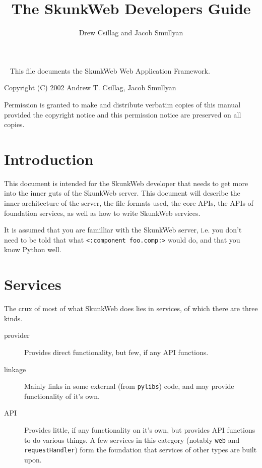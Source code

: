 \documentclass{manual}
\title{The SkunkWeb Developers Guide}
\author{Drew Csillag and Jacob Smullyan}
\begin{document}
\newcommand{\Location}{\texttt{Location}}
\newcommand{\PAR}{\texttt{par}}
\newcommand{\mskunkroot}[1]{\textit{SkunkRoot}\texttt{#1}}
\newcommand{\swpython}{\texttt{swpython}}
\newcommand{\connection}{\texttt{Connection}}
\newcommand{\NOTE}[1]{\textbf{\Large #1}}
\newcommand{\None}{\texttt{None}}
\newcommand{\nolocation}{[N]}
\newcommand{\service}[1]{\texttt{#1}\index{\texttt{#1}}}

\newcommand{\argdescitem}[1]{\hspace\labelsep
                                \normalfont\ttfamily #1\ }
\newenvironment{argdesc}{\begin{list}{}{
        \renewcommand{\makelabel}{\argdescitem}
}
}{\end{list}}

\maketitle
\ 
\vfill 
\noindent
This file documents the SkunkWeb Web Application Framework.

\noindent
Copyright (C) 2002 Andrew T. Csillag, Jacob Smullyan

\noindent
Permission is granted to make and distribute verbatim copies of
this manual provided the copyright notice and this permission notice
are preserved on all copies.


\tableofcontents

\chapter{Introduction}
This document is intended for the SkunkWeb developer that needs to get
more into the inner guts of the SkunkWeb server.  This document will
describe the inner architecture of the server, the file formats used,
the core APIs, the APIs of foundation services,
as well as how to
write SkunkWeb services.

It is assumed that you are familliar with the SkunkWeb server,
i.e. you don't need to be told that what \texttt{<:component
foo.comp:>} would do, and that you know Python well.

\chapter{Services}
The crux of most of what SkunkWeb does lies in services, of which
there are three kinds.
\begin{description}
\item[provider] Provides direct functionality, but few, if any API functions.
\item[linkage] Mainly links in some external (from \texttt{pylibs})
code, and may provide functionality of it's own.
\item[API] Provides little, if any functionality on it's own, but
provides API functions to do various things.  A few services in this
category (notably \texttt{web} and \texttt{requestHandler}) form the
foundation that services of other types are built upon.
\end{description}
\end{document}
